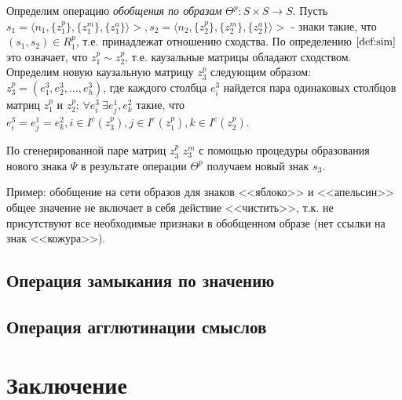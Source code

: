 \documentclass[12pt]{scrartcl}
\begin{document}
	Определим операцию \textit{обобщения по образам} $\Theta^p: S\times S\rightarrow S$. Пусть $s_1=\langle n_1, \{z_1^p\}, \{z_1^m\}, \{z_1^a\} \rangle>, s_2=\langle n_2, \{z_2^p\}, \{z_2^m\}, \{z_2^a\} \rangle>$ - знаки такие, что $(s_1,s_2)\in R_1^p$, т.е. принадлежат отношению сходства. По определению $\autoref{def:sim}$ это означает, что $z_1^p\sim z_2^p$, т.е. каузальные матрицы обладают сходством. Определим новую каузальную матрицу $z_3^p$ следующим образом: $z_3^p=(e_1^3,e_2^3,\dots,e_h^3)$, где каждого столбца $e_i^3$ найдется пара одинаковых столбцов матриц $z_1^p$ и $z_2^p$: $\forall e_i^3\ \exists e_j^1, e_k^2$ такие, что $ e_i^3=e_j^1=e_k^2, i\in I^c(z_3^p), j\in I^c(z_1^p), k\in I^c(z_2^p)$.
	
	По сгенерированной паре матриц $z_3^p$ $z_3^m$ с помощью процедуры образования нового знака $\Psi$ в результате операции $\Theta^p$ получаем новый знак $s_3$.
	
	Пример: обобщение на сети образов для знаков <<яблоко>> и <<апельсин>> общее значение не включает в себя действие <<чистить>>, т.к. не присутствуют все необходимые признаки в обобщенном образе (нет ссылки на знак <<кожура>>).
	
	\subsection{Операция замыкания по значению}
	
	\subsection{Операция агглютинации смыслов}
	
	\section*{Заключение}
	
	\printbibliography
\end{document}
